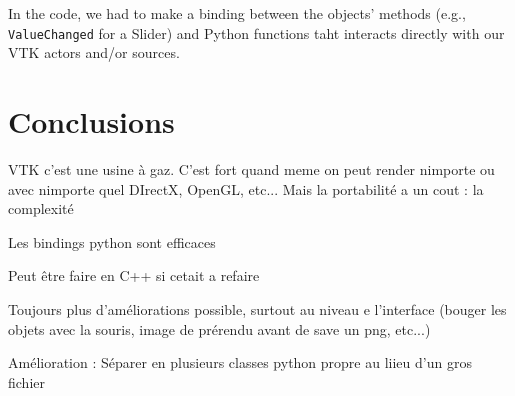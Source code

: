 \documentclass[10pt,twocolumn,letterpaper]{article}
\def\code#1{\texttt{#1}}
\begin{document}
In the code, we had to make a binding between the objects' methods (e.g.,
\code{ValueChanged} for a Slider) and Python functions taht interacts directly with
our VTK actors and/or sources.

\section*{Conclusions}

VTK c'est une usine à gaz. C'est fort quand meme on peut render nimporte ou avec
nimporte quel DIrectX, OpenGL, etc... Mais la portabilité a un cout : la complexité

Les bindings python sont efficaces

Peut être faire en C++ si cetait a refaire

Toujours plus d'améliorations possible, surtout au niveau e l'interface
(bouger les objets avec la souris, image de prérendu avant de save un png, etc...)

Amélioration : Séparer en plusieurs classes python propre au liieu d'un gros fichier


\end{document}
